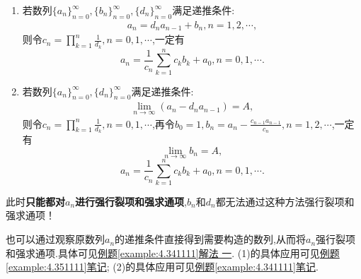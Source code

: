\documentclass[../../main.tex]{subfiles}%
\begin{document}
\begin{proposition}[强求通项和强行裂项]\label{proposition:强求通项和强行裂项}
\begin{enumerate}[(1)]
\item 若数列\(\{ a_n \}_{n = 0}^{\infty}, \{ b_n \}_{n = 0}^{\infty}, \{ d_n \}_{n = 0}^{\infty}\)满足递推条件:
\begin{align}\label{proposition4.8-0.1}
a_n = d_na_{n - 1} + b_n, n = 1, 2, \cdots,  
\end{align}
则令\(c_n = \prod_{k = 1}^n{\frac{1}{d_k}}, n = 0, 1, \cdots\),一定有
\[
a_n = \frac{1}{c_n}\sum_{k = 1}^n{c_kb_k} + a_0, n = 0, 1, \cdots.
\]

\item 若数列\(\{ a_n \}_{n = 0}^{\infty}, \{ d_n \}_{n = 0}^{\infty}\)满足递推条件:
\begin{align}\label{proposition4.8-0.2}
\lim_{n\rightarrow \infty}(a_n - d_na_{n - 1}) = A,  
\end{align}
则令\(c_n = \prod_{k = 1}^n{\frac{1}{d_k}}, n = 0, 1, \cdots\),再令\(b_0 = 1, b_n = a_n - \frac{c_{n - 1}a_{n - 1}}{c_n}, n = 1, 2, \cdots\),一定有
\[
\lim_{n\rightarrow \infty}b_n = A,
\]
\[
a_n = \frac{1}{c_n}\sum_{k = 1}^n{c_kb_k} + a_0, n = 0, 1, \cdots.
\]
\end{enumerate}
\end{proposition}
\begin{remark}
此时\textbf{只能都对\(a_n\)进行强行裂项和强求通项},\(b_n\)和\(d_n\)都无法通过这种方法强行裂项和强求通项！
\end{remark}
\begin{note}
也可以通过观察原数列$a_n$的递推条件直接得到需要构造的数列,从而将$a_n$强行裂项和强求通项.具体可见\hyperref[example:4.341111]{例题\ref{example:4.341111}解法
一}.
(1)的具体应用可见\hyperlink{递推条件是等式形式的待定数列法}{例题\ref{example:4.351111}笔记};
(2)的具体应用可见\hyperlink{递推条件是极限形式的待定数列法}{例题\ref{example:4.341111}笔记}.
\end{note}
\end{document}
